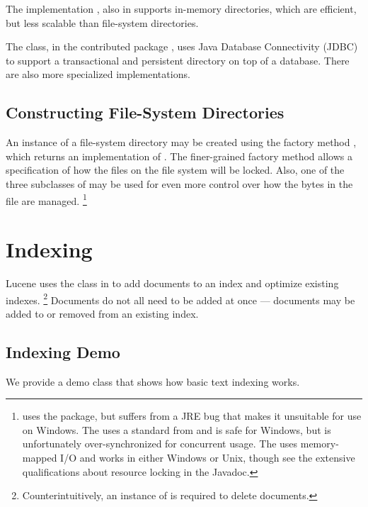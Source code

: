 The implementation , also in
 supports in-memory directories, which are efficient, but
less scalable than file-system directories.  

The 
class, in the contributed package ,
uses Java Database Connectivity (JDBC) to support a transactional and
persistent directory on top of a database.  There are also more
specialized implementations.

\subsection{Constructing File-System Directories}

An instance of a file-system directory may be created using the
factory method , which returns an
implementation of .  The finer-grained factory
method  allows a specification of how the
files on the file system will be locked.  Also, one of the three
subclasses of  may be used for even more control
over how the bytes in the file are managed.%
%
\footnote{ uses the  package, but
  suffers from a JRE bug that makes it unsuitable for use on Windows.
  The  uses a standard 
  from  and is safe for Windows, but is unfortunately
  over-synchronized for concurrent usage.  The 
  uses memory-mapped I/O and works in either Windows or Unix, though
  see the extensive qualifications about resource locking in the
  Javadoc.}


\section{Indexing}

Lucene uses the  class in
 to add documents to an index and
optimize existing indexes.%
%
\footnote{Counterintuitively, an instance of  is
required to delete documents.}
%
Documents do not all need to be added at
once --- documents may be added to or removed from an existing index.

\subsection{Indexing Demo}

We provide a demo class  that shows how basic
text indexing works.  

